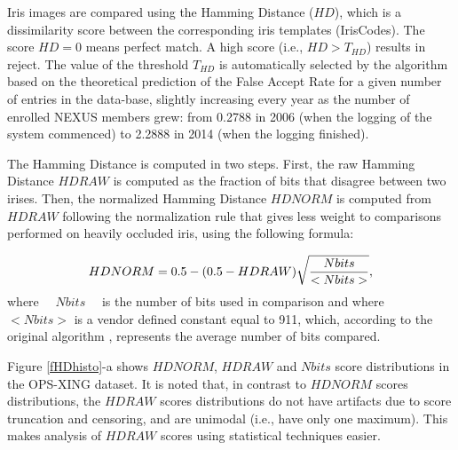 \documentclass{cta-author}%
\begin{document}
Iris images are compared using the Hamming Distance ($HD$), which is a dissimilarity score between the corresponding  iris templates (IrisCodes). 
The score $HD=0$ means perfect match.  A high score (i.e., $HD >T_{HD}$) results in reject. The value of the threshold $T_{HD}$ is automatically selected by the algorithm based on the theoretical prediction of the False Accept Rate for a given number of entries in the data-base, slightly increasing every year as the number of enrolled NEXUS members grew: from 0.2788 in 2006 (when the logging of the system commenced) to 2.2888 in 2014 (when the logging finished).

The Hamming Distance is computed in two steps.
First, the raw Hamming Distance $HDRAW$ is computed as the fraction of bits that disagree between two irises.
Then, the normalized Hamming Distance $HDNORM$ is computed from $HDRAW$ following the normalization rule that gives less weight to comparisons performed on heavily occluded iris, using the following formula:

\begin{equation}
HDNORM = 0.5-(0.5-HDRAW)\sqrt{  Nbits \over <Nbits>},  
\label{EQN}
\end{equation}
where ~~$Nbits$~~ is  the number of bits used in comparison  
and where~~
$<Nbits>$ is a vendor defined constant equal to 911, which, according to the original algorithm \cite{Daugman2006}, represents the average number of bits compared. 


Figure \ref{fHDhisto}-a  shows  $HDNORM$, $HDRAW$ and $Nbits$ score distributions in the OPS-XING dataset.
It is noted that, in contrast to   $HDNORM$ scores distributions, the $HDRAW$ scores distributions do not have  artifacts due to score truncation and censoring, and are unimodal (i.e., have only one maximum). This makes analysis of  $HDRAW$ scores using statistical techniques easier.
\end{document}
